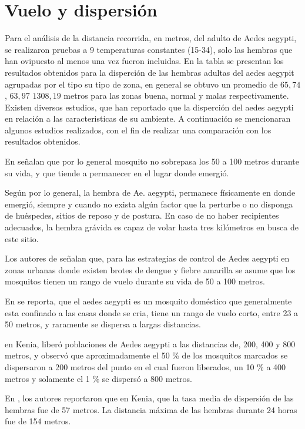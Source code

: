 \section{Vuelo y dispersión}
Para el análisis de la distancia recorrida, en metros, del adulto de Aedes aegypti, se realizaron
pruebas a 9 temperaturas constantes (15-34\textcelsius), solo las hembras que han ovipuesto al
menos una vez fueron incluidas. En la tabla  se presentan los
resultados obtenidos para la disperción de las hembras adultas del aedes aegypit agrupadas por el
tipo su tipo de zona, en general se obtuvo un promedio de $65,74$, $63,97$ $1308,19$ metros para las zonas buena, normal y malas respectivamente. Existen diversos estudios, que han reportado que
la disperción del aedes aegypti en relación a las caracteristicas de su ambiente. A continuación
se mencionaran algunos estudios realizados, con el fin de realizar una comparación con los resultados obtenidos.

En \citet{cabezas2005dengue} señalan que por lo general mosquito no sobrepasa los 50 a 100 metros
durante su vida, y que tiende a permanecer en el lugar donde emergió.

Según \citet{ThironIzcazaJ2003} por lo general, la hembra de Ae. aegypti, permanece físicamente en
donde emergió, siempre y cuando no exista algún factor que la perturbe o no disponga de huéspedes,
sitios de reposo y de postura. En caso de no haber recipientes adecuados, la hembra grávida es capaz de volar hasta tres kilómetros en busca de este sitio.

Los autores de \citet{dengueUruguayCap8} señalan que, para las estrategias de control de Aedes
aegypti en zonas urbanas donde existen brotes de dengue y fiebre amarilla se asume que los
mosquitos tienen un rango de vuelo durante su vida de 50 a 100 metros.

En \citet{luevano1993ciclo} se reporta, que el aedes aegypti es un mosquito doméstico que
generalmente esta confinado a las casas donde se cria, tiene un rango de vuelo corto, entre 23 a 50 metros, y raramente se dispersa a largas distancias.

\citet{mcdonald1977population} en Kenia, liberó poblaciones de Aedes aegypti a las distancias de,
200, 400 y 800 metros, y observó que aproximadamente el 50 \% de los mosquitos marcados se
dispersaron a 200 metros del punto en el cual fueron liberados, un 10 \% a 400 metros y solamente
el 1 \% se dispersó a 800 metros.

En \citet{trpis1986dispersal}, los autores reportaron que en Kenia, que la tasa media de dispersión
de las hembras fue de 57 metros. La distancia máxima de las hembras durante 24 horas fue de 154
metros.

